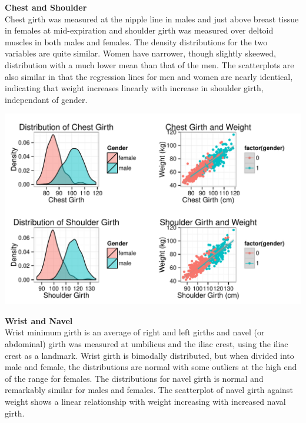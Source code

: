 \documentclass[11pt]{article}\usepackage[]{graphicx}\usepackage[]{color}
\makeatletter
\def\maxwidth{ %
  \ifdim\Gin@nat@width>\linewidth
    \linewidth
  \else
    \Gin@nat@width
  \fi
}
\newenvironment{knitrout}{}{} %
\makeatother
\begin{document}
\textbf{Chest and Shoulder}\\
   
Chest girth was measured at the nipple line in males and just above breast tissue in females at mid-expiration and shoulder girth was measured over deltoid muscles in both males and females. The density distributions for the two variables are quite similar. Women have narrower, though slightly skeewed, distribution with a much lower mean than that of the men. The scatterplots are also similar in that the regression lines for men and women are nearly identical, indicating that weight increases linearly with increase in shoulder girth, independant of gender.

\begin{knitrout}
\color{fgcolor}
\includegraphics[width=\maxwidth]{figure/chest_plots} 

\end{knitrout}



\textbf{Wrist and Navel}\\
   
Wrist minimum girth is an average of right and left girths and navel (or abdominal) girth was measured at umbilicus and the iliac crest, using the iliac crest as a landmark. Wrist girth is bimodally distributed, but when divided into male and female, the distributions are normal with some outliers at the high end of the range for females. The distributions for navel girth is normal and remarkably similar for males and females. The scatterplot of navel girth against weight shows a linear relationship with weight increasing with increased naval girth.
\end{document}
